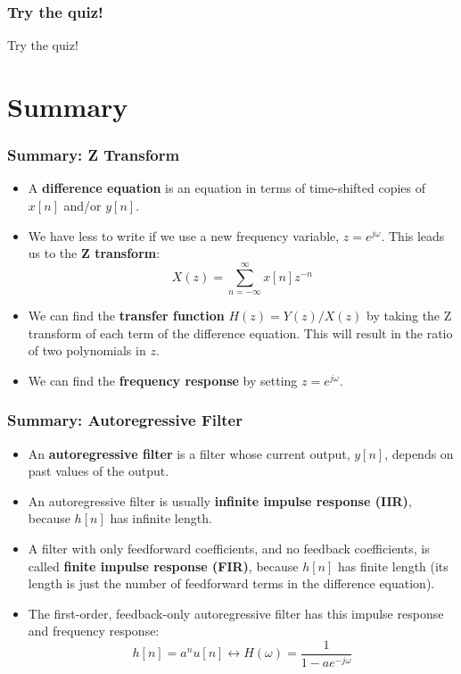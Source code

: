 \documentclass{beamer}
\begin{document}
\begin{frame}
  \frametitle{Try the quiz!}

  Try the quiz!
\end{frame}

\section[Summary]{Summary}
\setcounter{subsection}{1}

\begin{frame}
  \frametitle{Summary: Z Transform}
  \begin{itemize}
  \item A {\bf difference equation} is an equation in terms of
    time-shifted copies of $x[n]$ and/or $y[n]$.
  \item We have less to write if we use a new frequency variable,
    $z=e^{j\omega}$.  This leads us to the \textbf{Z transform}:
    \[
    X(z) = \sum_{n=-\infty}^\infty x[n]z^{-n}
    \]
  \item We can find the \textbf{transfer function}
    $H(z)=Y(z)/X(z)$ by taking the Z transform of each term of
    the difference equation.  This will result in the ratio of two polynomials in $z$.
  \item We can find the \textbf{frequency response} by
    setting $z=e^{j\omega}$.
  \end{itemize}
\end{frame}

\begin{frame}
  \frametitle{Summary: Autoregressive Filter}
  \begin{itemize}
  \item An {\bf autoregressive filter} is a filter whose current output,
    $y[n]$, depends on  past values of the output.
  \item An autoregressive filter is usually {\bf infinite impulse response (IIR)},
    because $h[n]$ has infinite length.
  \item A filter with only feedforward coefficients, and no feedback coefficients, is called
    {\bf finite impulse response (FIR)}, because $h[n]$ has finite length (its length is
    just the number of feedforward terms in the difference equation).
  \item The first-order, feedback-only autoregressive filter has this
    impulse response and frequency response:
    \[
    h[n]=a^n u[n] \leftrightarrow H(\omega)  = \frac{1}{1-ae^{-j\omega}}
    \]
  \end{itemize}
\end{frame}
\end{document}
